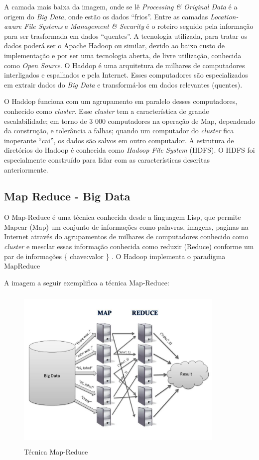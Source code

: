 \documentclass[conference,compsoc]{IEEEtran}
\begin{document}
A camada mais baixa da imagem, onde se lê \textit{Processing \& Original Data} é a origem do \textit{Big Data}, onde estão os dados ``frios''. Entre as camadas \textit{Location-aware File Systems} e \textit{Management \& Security} é o roteiro seguido pela informação para ser trasformada em dados ``quentes''. A tecnologia utilizada, para tratar os dados poderá ser o Apache Hadoop ou similar, devido ao baixo custo de implementação e por ser uma tecnologia aberta, de livre utilização, conhecida como \textit{Open Source}. O Haddop é uma arquitetura de milhares de computadores interligados e espalhados e pela Internet. Esses computadores são especializados em extrair dados do \textit{Big Data} e transformá-los em dados relevantes (quentes). \cite{Conejero2015}

O Haddop funciona com um agrupamento em paralelo desses computadores, conhecido como \textit{cluster}. Esse \textit{cluster} tem a característica de grande escalabilidade; em torno de 3 000 computadores na operação de Map, dependendo da construção, e tolerância a falhas; quando um computador do \textit{cluster} fica inoperante  ``cai'', os dados são salvos em outro computador. A estrutura de diretórios do Hadoop é conhecida como \textit{Hadoop File System} (HDFS). O HDFS foi especialmente construído para lidar com as características descritas anteriormente.



\subsection{Map Reduce - Big Data}\label{arte:palavraChave:MapReduceBigData}

O Map-Reduce é uma técnica conhecida desde a linguagem Lisp, que permite Mapear (Map) um conjunto de informações como palavras, imagens, paginas na Internet através do agrupamentos de milhares de computadores conhecido como \textit{cluster} e mesclar essas informação conhecida como reduzir (Reduce) conforme um par de informações \{ chave:valor \} .  
O Hadoop implementa o paradigma MapReduce

A imagem a seguir exemplifica a técnica Map-Reduce:

\begin{figure}[ht]
\centering
\caption{Técnica Map-Reduce}
\includegraphics[width=100mm, height=80mm]{Figuras/MapReduce.jpg}
\end{figure}
\end{document}
